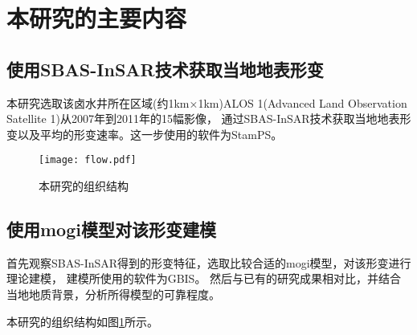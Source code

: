 \section{本研究的主要内容}

\subsection{使用SBAS-InSAR技术获取当地地表形变}
本研究选取该卤水井所在区域(约1km×1km)ALOS 1(Advanced Land Observation Satellite 1)从2007年到2011年的15幅影像，
通过SBAS-InSAR技术获取当地地表形变以及平均的形变速率。这一步使用的软件为StamPS。
\begin{figure}[htb]
  \centering
  \texttt{[image: flow.pdf]}
  \caption{本研究的组织结构}
  \label{fig:flow}
\end{figure}

\subsection{使用mogi模型对该形变建模}
首先观察SBAS-InSAR得到的形变特征，选取比较合适的mogi模型，对该形变进行理论建模，
建模所使用的软件为GBIS。
然后与已有的研究成果相对比，并结合当地地质背景，分析所得模型的可靠程度。

本研究的组织结构如图\ref{fig:flow}所示。